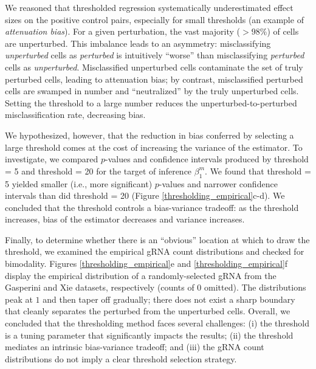 \documentclass[12pt]{article}
\begin{document}
We reasoned that thresholded regression systematically underestimated effect sizes on the positive control pairs, especially for small thresholds (an example of \textit{attenuation bias}). For a given perturbation, the vast majority ($>98\%$) of cells are unperturbed. This imbalance leads to an asymmetry: misclassifying \textit{unperturbed} cells as \textit{perturbed} is intuitively ``worse'' than misclassifying \textit{perturbed} cells as \textit{unperturbed}. Misclassified unperturbed cells contaminate the set of truly perturbed cells, leading to attenuation bias; by contrast, misclassified perturbed cells are swamped in number and ``neutralized'' by the truly unperturbed cells. Setting the threshold to a large number reduces the unperturbed-to-perturbed misclassification rate, decreasing bias.

We hypothesized, however, that the reduction in bias conferred by selecting a large threshold comes at the cost of increasing the variance of the estimator. To investigate, we compared $p$-values and confidence intervals produced by threshold = 5 and threshold = 20 for the target of inference $\beta^m_1$. We found that threshold = 5 yielded smaller (i.e., more significant) $p$-values and narrower confidence intervals than did threshold = 20 (Figure \ref{thresholding_empirical}c-d). We concluded that the threshold controls a bias-variance tradeoff: as the threshold increases, bias of the estimator decreases and variance increases.

Finally, to determine whether there is an ``obvious'' location at which to draw the threshold, we examined the empirical gRNA count distributions and checked for bimodality. Figures \ref{thresholding_empirical}e and \ref{thresholding_empirical}f display the empirical distribution of a randomly-selected gRNA from the Gasperini and Xie datasets, respectively (counts of $0$ omitted). The distributions peak at $1$ and then taper off gradually; there does not exist a sharp boundary that cleanly separates the perturbed from the unperturbed cells. Overall, we concluded that the thresholding method faces several challenges: (i) the threshold is a tuning parameter that significantly impacts the results; (ii) the threshold mediates an intrinsic bias-variance tradeoff; and (iii) the gRNA count distributions do not imply a clear threshold selection strategy.
\end{document}
